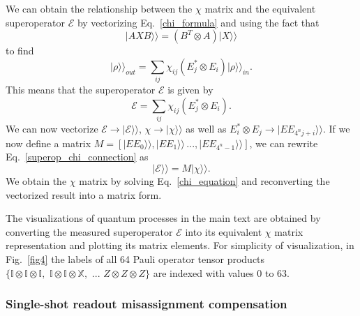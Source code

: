 \documentclass[12pt]{article}
\begin{document}
We can obtain the relationship between the $\chi$ matrix and the equivalent superoperator $\mathcal{E}$ by vectorizing Eq.~\ref{chi_formula} and using the fact that
\begin{equation}
\vert AXB \rangle\rangle = (B^T \otimes A) \vert X \rangle\rangle
\end{equation}
to find
\begin{equation}
\vert \rho \rangle\rangle_{out} = \sum_{ij} \chi_{ij} (E_j^* \otimes E_i) \vert \rho \rangle\rangle_{in}.
\end{equation}
This means that the superoperator $\mathcal{E}$ is given by
\begin{equation}
\label{superop_chi_connection}
\mathcal{E} = \sum_{ij} \chi_{ij} (E_j^* \otimes E_i).
\end{equation}
We can now vectorize $\mathcal{E} \rightarrow \vert \mathcal{E}\rangle\rangle$, $\chi \rightarrow \vert \chi\rangle\rangle$ as well as $E_i^* \otimes E_j \rightarrow \vert EE_{4^nj + i}\rangle\rangle$. If we now define a matrix $M = [\vert EE_{0}\rangle\rangle, \vert EE_{1}\rangle\rangle\, ..., \vert EE_{4^n-1}\rangle\rangle  ]$, we can rewrite Eq.~\ref{superop_chi_connection} as
\begin{equation}
\label{chi_equation}
\vert \mathcal{E}\rangle\rangle = M \vert \chi\rangle\rangle.
\end{equation}
We obtain the $\chi$ matrix by solving Eq.~\ref{chi_equation} and reconverting the vectorized result into a matrix form.

The visualizations of quantum processes in the main text are obtained by converting the measured superoperator $\mathcal{E}$ into its equivalent $\chi$ matrix representation and plotting its matrix elements. For simplicity of visualization, in Fig.~\ref{fig4} the labels of all 64 Pauli operator tensor products $\{ \mathbb{I} \otimes \mathbb{I} \otimes \mathbb{I},\,\, \mathbb{I} \otimes \mathbb{I} \otimes \mathbb{X},\,\, ...\,\, Z \otimes Z \otimes Z \}$ are indexed with values 0 to 63.


\subsubsection{Single-shot readout misassignment compensation}
\end{document}
